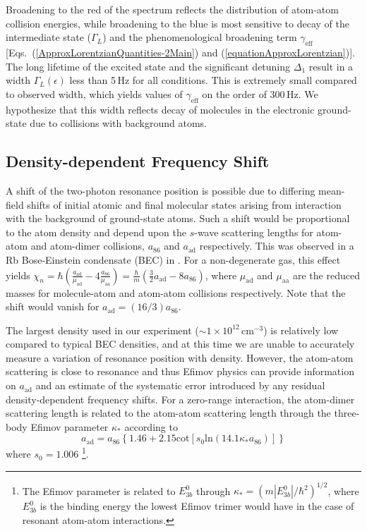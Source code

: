 Broadening to the red of the spectrum reflects the distribution of atom-atom collision energies, while broadening to the blue is most sensitive to decay of the intermediate state ($\Gamma_L$) and the phenomenological broadening term $\gamma_{\text{eff}}$ [Eqs.\ (\ref{ApproxLorentzianQuantities-2Main}) and (\ref{equationApproxLorentzian})]. The long lifetime of the excited state and the significant detuning $\Delta_1$ result in a width $\Gamma_L(\epsilon)$ less than 5\,Hz for all conditions. This is extremely small compared to observed width, which yields values of $\gamma_{\text{eff}}$ on the order of 300\,Hz. We hypothesize that this width reflects decay of molecules in the electronic ground-state due to collisions with background atoms.

\subsection{Density-dependent Frequency Shift}
A shift of the two-photon resonance position is possible due to differing mean-field shifts of initial atomic and final molecular states arising from interaction with the background of ground-state atoms. Such a shift would be proportional to the atom density and depend upon the $s$-wave scattering lengths for atom-atom and atom-dimer collisions, $a_{86}$ and $a_{\text{ad}}$ respectively. This was observed in a Rb Bose-Einstein condensate (BEC) in \cite{wfh00}. For a non-degenerate gas, this effect yields $\chi_n=\hbar (\frac{a_{\text{ad}}}{\mu_{\text{ad}}}-4\frac{a_{86}}{\mu_{\text{aa}}})=\frac{\hbar}{m} (\frac{3 }{2}a_{\text{ad}}-8 a_{86})$, where $\mu_{\text{ad}}$ and $\mu_{\text{aa}}$ are the reduced masses for molecule-atom and atom-atom collisions respectively. Note that the shift would vanish for $a_{\text{ad}}=(16/3) a_{86}$.

The largest density used in our experiment ($\sim 1\times 10^{12}\,\mathrm{cm}^{-3}$) is relatively low compared to typical BEC densities, and at this time we are unable to accurately measure a variation of resonance position with density. However, the atom-atom scattering is close to resonance and thus Efimov physics can provide information on $a_{\text{ad}}$ \cite{bha07,nen17} and an estimate of the systematic error introduced by any residual density-dependent frequency shifts. For a zero-range interaction, the atom-dimer scattering length is related to the atom-atom scattering length through the three-body Efimov parameter $\kappa_*$ according to \cite{bha07}
\begin{equation}\label{Eq:EfimovMoleculAtomScatteringLength}
  a_{\text{ad}}=a_{86}\left\{1.46 + 2.15 \mathrm{cot}[s_0 \mathrm{ln} (14.1\kappa_* a_{86}) ]\right\}
\end{equation}
where $s_0=1.006$ \footnote{The Efimov parameter is related to $E^0_{3b}$ through $\kappa_*=(m|E^0_{3b}|/\hbar^2)^{1/2}$, where $E^0_{3b}$ is the binding energy the lowest Efimov trimer would have in the case of resonant atom-atom interactions.}.

